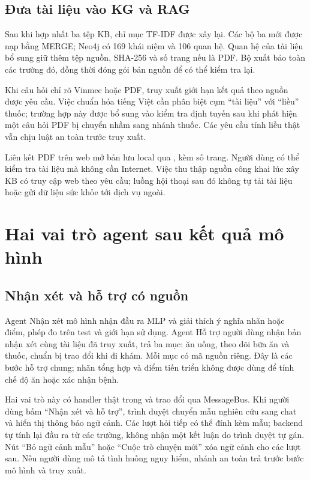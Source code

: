 \subsection{Đưa tài liệu vào KG và RAG}
Sau khi hợp nhất ba tệp KB, chỉ mục TF-IDF được xây lại. Các bộ ba mới được nạp bằng MERGE; Neo4j có 169 khái niệm và 106 quan hệ. Quan hệ của tài liệu bổ sung giữ thêm tệp nguồn, SHA-256 và số trang nếu là PDF. Bộ xuất bảo toàn các trường đó, đồng thời đóng gói bản nguồn để có thể kiểm tra lại.

Khi câu hỏi chỉ rõ Vinmec hoặc PDF, truy xuất giới hạn kết quả theo nguồn được yêu cầu. Việc chuẩn hóa tiếng Việt cần phân biệt cụm ``tài liệu'' với ``liều'' thuốc; trường hợp này được bổ sung vào kiểm tra định tuyến sau khi phát hiện một câu hỏi PDF bị chuyển nhầm sang nhánh thuốc. Các yêu cầu tính liều thật vẫn chịu luật an toàn trước truy xuất.

Liên kết PDF trên web mở bản lưu local qua , kèm số trang. Người dùng có thể kiểm tra tài liệu mà không cần Internet. Việc thu thập nguồn công khai lúc xây KB có truy cập web theo yêu cầu; luồng hội thoại sau đó không tự tải tài liệu hoặc gửi dữ liệu sức khỏe tới dịch vụ ngoài.

\section{Hai vai trò agent sau kết quả mô hình}
\subsection{Nhận xét và hỗ trợ có nguồn}
Agent Nhận xét mô hình nhận đầu ra MLP và giải thích ý nghĩa nhãn hoặc điểm, phép đo trên test và giới hạn sử dụng. Agent Hỗ trợ người dùng nhận bản nhận xét cùng tài liệu đã truy xuất, trả ba mục: ăn uống, theo dõi bữa ăn và thuốc, chuẩn bị trao đổi khi đi khám. Mỗi mục có mã nguồn riêng. Đây là các bước hỗ trợ chung; nhãn tổng hợp và điểm tiến triển không được dùng để tính chế độ ăn hoặc xác nhận bệnh.

Hai vai trò này có handler thật trong  và trao đổi qua MessageBus. Khi người dùng bấm ``Nhận xét và hỗ trợ'', trình duyệt chuyển mẫu nghiên cứu sang chat và hiển thị thông báo ngữ cảnh. Các lượt hỏi tiếp có thể đính kèm mẫu; backend tự tính lại đầu ra từ các trường, không nhận một kết luận do trình duyệt tự gán. Nút ``Bỏ ngữ cảnh mẫu'' hoặc ``Cuộc trò chuyện mới'' xóa ngữ cảnh cho các lượt sau. Nếu người dùng mô tả tình huống nguy hiểm, nhánh an toàn trả trước bước mô hình và truy xuất.

